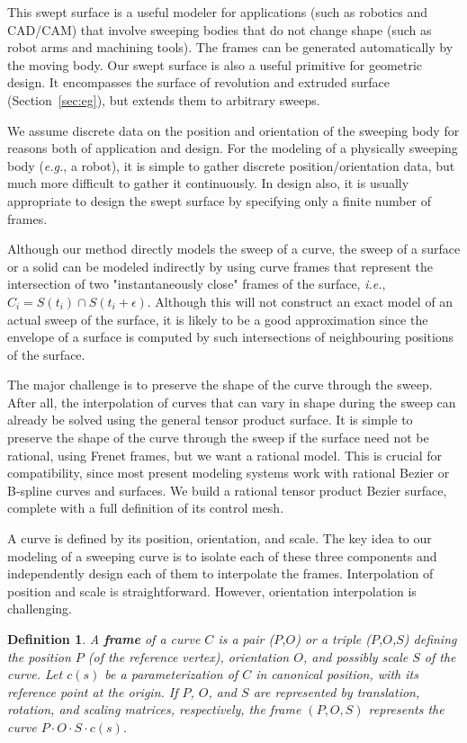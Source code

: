 \documentclass[times]{article}
\newtheorem{defn2}{Definition}
\begin{document}
This swept surface is a useful modeler for applications (such as
robotics and CAD/CAM) that involve sweeping bodies that do not change shape 
(such as robot arms and machining tools).
The frames can be generated automatically by the moving body.
Our swept surface is also a useful primitive for geometric design.
It encompasses the surface of revolution and extruded surface
(Section~\ref{sec:eg}), but extends them to arbitrary sweeps.

We assume discrete data on the position and orientation
of the sweeping body for reasons both of application and design.
For the modeling of a physically sweeping body ({\em e.g.}, a robot), 
it is simple to gather discrete position/orientation data, 
but much more difficult to gather it continuously.
In design also, it is usually appropriate to design the swept surface
by specifying only a finite number of frames.

Although our method directly models the sweep of a curve,
the sweep of a surface or a solid can be modeled indirectly
by using curve frames that represent the intersection of two 
"instantaneously close" frames of the surface,
{\em i.e.}, $C_i = S(t_i) \cap S(t_i+\epsilon)$.
Although this will not construct an 
exact model of an actual sweep of the surface,
it is likely to be a good approximation since the 
envelope of a surface is computed by such intersections
of neighbouring positions of the surface.

The major challenge is to preserve the shape of the curve through the sweep.
After all, the interpolation of curves that can vary in shape during the sweep
can already be solved using the general tensor product surface.
It is simple to preserve the shape of the curve through the sweep
if the surface need not be rational, using Frenet frames,
but we want a rational model.
This is crucial for compatibility, 
since most present modeling systems work with rational Bezier or
B-spline curves and surfaces.
We build a rational tensor product Bezier surface, complete with a full
definition of its control mesh.

A curve is defined by its position, orientation, and scale.
The key idea to our modeling of a sweeping curve is to isolate each
of these three components and independently design each of them 
to interpolate the frames.
Interpolation of position and scale is straightforward.
However, orientation interpolation is challenging.

\begin{defn2}
{\em
A {\bf frame} of a curve $C$ is a pair ($P$,$O$) or a triple 
($P$,$O$,$S$)
defining the position $P$ (of the reference vertex), 
orientation $O$, and possibly scale $S$ of the curve.
Let $c(s)$ be a parameterization of $C$ in canonical position,
with its reference point at the origin.
If $P$, $O$, and $S$ are represented by translation, rotation, and scaling 
matrices, respectively, the frame $(P,O,S)$ represents the curve 
$P \cdot O \cdot S \cdot c(s)$.
}
\end{defn2}
\end{document}
